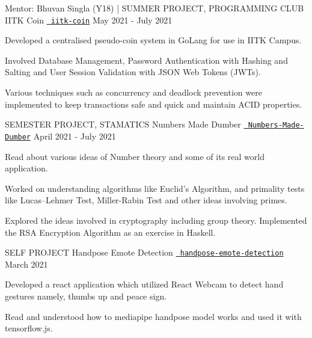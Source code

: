

\begin{cventries}

  \cventry
  {Mentor: Bhuvan Singla (Y18) | SUMMER PROJECT, PROGRAMMING CLUB}
  {IITK Coin}
  {\texttt{\href{https://github.com/abhishekshree/iitk-coin}{\faGithub{} iitk-coin}}}
  {May 2021 - July 2021}
  {
    \begin{cvitems}
      \item Developed a centralised pseudo-coin system in GoLang for use in IITK Campus.
      \item Involved Database Management, Password Authentication with Hashing and Salting and User Session Validation with JSON Web Tokens (JWTs).
      \item Various techniques such as concurrency and deadlock prevention were implemented to keep transactions safe and quick and maintain ACID properties.
    \end{cvitems}
  }
 \vspace{0.2cm}
  \cventry
  {SEMESTER PROJECT, STAMATICS}
  {Numbers Made Dumber}
  {\texttt{\href{https://github.com/abhishekshree/Numbers-Made-Dumber}{\faGithub{} Numbers-Made-Dumber}}}
  {April 2021 - July 2021}
  {
    \begin{cvitems}
      \item Read about various ideas of Number theory and some of its real world application.
      \item Worked on understanding algorithms like Euclid's Algorithm, and primality tests like Lucas–Lehmer Test, Miller-Rabin Test and other ideas involving primes.
      \item Explored the ideas involved in cryptography including group theory. Implemented the RSA Encryption Algorithm as an exercise in Haskell.
    \end{cvitems}
  }
 \vspace{0.2cm}
  
  \cventry
  {SELF PROJECT}
  {Handpose Emote Detection}
  {\texttt{\href{https://github.com/abhishekshree/handpose-emote-detection}{\faGithub{} handpose-emote-detection}}}
  {March 2021}
  {
    \begin{cvitems}
      \item Developed a react application which utilized React Webcam to detect hand gestures namely, thumbs up and peace sign.
      \item Read and understood how to mediapipe handpose model works and used it with tensorflow.js.
    \end{cvitems}
  }
 \vspace{0.2cm}
  

\end{cventries}
